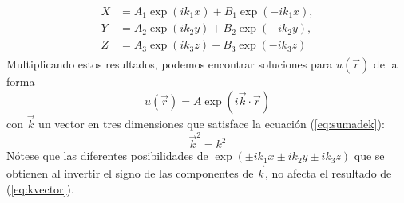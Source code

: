 \begin{eqnarray}
\begin{aligned}
X &= A_{1} \exp(i k_{1} x) + B_{1} \exp(-i k_{1} x), \\
Y &= A_{2} \exp(i k_{2} y) + B_{2} \exp(-i k_{2} y), \\
Z &= A_{3} \exp(i k_{3} z) + B_{3} \exp(-i k_{3} z)
\end{aligned}  
\end{eqnarray}
Multiplicando estos resultados, podemos encontrar soluciones para $u(\overrightarrow{r})$ de la forma
\begin{equation}
u(\overrightarrow{r}) = A \exp(i \overrightarrow{k} \cdot \overrightarrow{r})
\end{equation}
con $\overrightarrow{k}$ un vector en tres dimensiones que satisface la ecuación (\ref{eq:sumadek}):
\begin{equation}
\overrightarrow{k}^{2} = k^{2} \label{eq:kvector}
\end{equation}
Nótese que las diferentes posibilidades de $\exp(\pm ik_{1} x \pm i k_{2} y \pm i k_{3} z)$ que se obtienen al invertir el signo de las componentes de $\overrightarrow{k}$, no afecta el resultado de (\ref{eq:kvector}).
